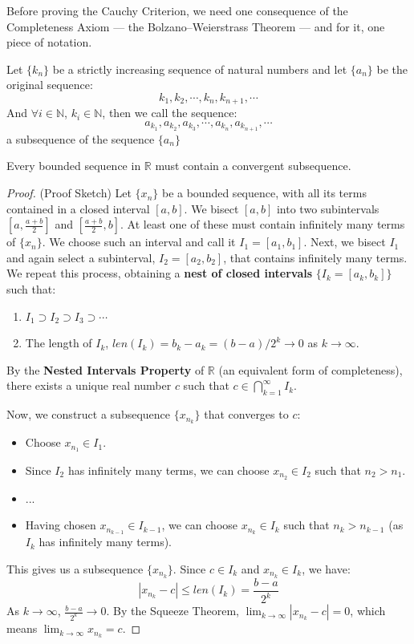 Before proving the Cauchy Criterion, we need one consequence of the Completeness Axiom — the Bolzano--Weierstrass Theorem — and for it, one piece of notation.

\begin{definition}[Subsequence]
    Let $\{k_n\}$ be a strictly increasing sequence of natural numbers and let $\{a_n\}$ be the original sequence:
    \[
    k_1, k_2, \cdots, k_n, k_{n+1}, \cdots
    \]
    And $\forall i \in \mathbb{N}$, $k_i \in \mathbb{N}$, then we call the sequence:
    \[
    a_{k_1}, a_{k_2}, a_{k_3}, \cdots , a_{k_n}, a_{k_{n+1}}, \cdots
    \]
    a subsequence of the sequence $\{a_n\}$
\end{definition}

\begin{theorem}
\label{thm:bw_en}
Every bounded sequence in $\mathbb{R}$ must contain a convergent subsequence.
\end{theorem}

\begin{proof}
(Proof Sketch) Let $\{x_n\}$ be a bounded sequence, with all its terms contained in a closed interval $[a, b]$.
We bisect $[a, b]$ into two subintervals $[a, \frac{a+b}{2}]$ and $[\frac{a+b}{2}, b]$. At least one of these must contain infinitely many terms of $\{x_n\}$. We choose such an interval and call it $I_1 = [a_1, b_1]$.
Next, we bisect $I_1$ and again select a subinterval, $I_2 = [a_2, b_2]$, that contains infinitely many terms.
We repeat this process, obtaining a \textbf{nest of closed intervals} $\{I_k = [a_k, b_k]\}$ such that:
\begin{enumerate}
    \item $I_1 \supset I_2 \supset I_3 \supset \cdots$
    \item The length of $I_k$, $len(I_k) = b_k - a_k = (b-a)/2^k \to 0$ as $k \to \infty$.
\end{enumerate}
By the \textbf{Nested Intervals Property} of $\mathbb{R}$ (an equivalent form of completeness), there exists a unique real number $c$ such that $c \in \bigcap_{k=1}^\infty I_k$.

Now, we construct a subsequence $\{x_{n_k}\}$ that converges to $c$:
\begin{itemize}
    \item Choose $x_{n_1} \in I_1$.
    \item Since $I_2$ has infinitely many terms, we can choose $x_{n_2} \in I_2$ such that $n_2 > n_1$.
    \item ...
    \item Having chosen $x_{n_{k-1}} \in I_{k-1}$, we can choose $x_{n_k} \in I_k$ such that $n_k > n_{k-1}$ (as $I_k$ has infinitely many terms).
\end{itemize}
This gives us a subsequence $\{x_{n_k}\}$. Since $c \in I_k$ and $x_{n_k} \in I_k$, we have:
\[
|x_{n_k} - c| \leq len(I_k) = \frac{b-a}{2^k}
\]
As $k \to \infty$, $\frac{b-a}{2^k} \to 0$. By the Squeeze Theorem, $\lim_{k \to \infty} |x_{n_k} - c| = 0$, which means $\lim_{k \to \infty} x_{n_k} = c$.
\end{proof}

